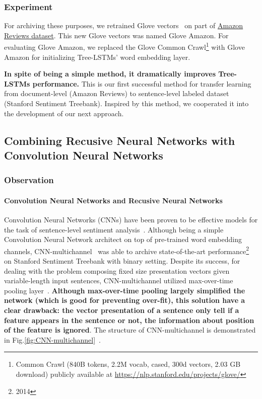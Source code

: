 \subsubsection{Experiment}
For archiving these purposes, we retrained Glove vectors~\cite{glove} on part of  \hyperref[sec:amazon]{Amazon Reviews dataset}.
This new Glove vectors was named Glove Amazon.
For evaluating Glove Amazon, we replaced the Glove Common Crawl\footnote{Common Crawl (840B tokens, 2.2M vocab, cased, 300d vectors, 2.03 GB download) publicly available at \url{https://nlp.stanford.edu/projects/glove/}} with Glove Amazon for initializing Tree-LSTMs' word embedding layer.

\textbf{In spite of being a simple method, it dramatically improves Tree-LSTMs performance.}
This is our first successful method for transfer learning from document-level (Amazon Reviews) to sentence-level labeled dataset (Stanford Sentiment Treebank).
Inspired by this method, we cooperated it into the development of our next approach.

\subsection{Combining Recusive Neural Networks with Convolution Neural Networks}

\subsubsection{Observation}
\paragraph{Convolution Neural Networks and Recusive Neural Networks}
Convolution Neural Networks (CNNs) have been proven to be effective models for the task of sentence-level sentiment analysis~\cite{KimCNN}.
Although being a simple Convolution Neural Network architect on top of pre-trained word embedding channels, CNN-multichannel~\cite{KimCNN} was able to archive state-of-the-art performance\footnote{2014} on Stanford Sentiment Treebank with binary setting.
Despite its success, for dealing with the problem composing fixed size presentation vectors given variable-length input sentences, CNN-multichannel utilized max-over-time pooling layer~\cite{nlp-scratch}.
\textbf{Although max-over-time pooling largely simplified the network (which is good for preventing over-fit), this solution have a clear drawback: the vector presentation of a sentence only tell if a feature appears in the sentence or not, the information about position of the feature is ignored}.
The structure of CNN-multichannel is demonstrated in Fig.\ref{fig:CNN-multichannel}~\cite{KimCNN}.

